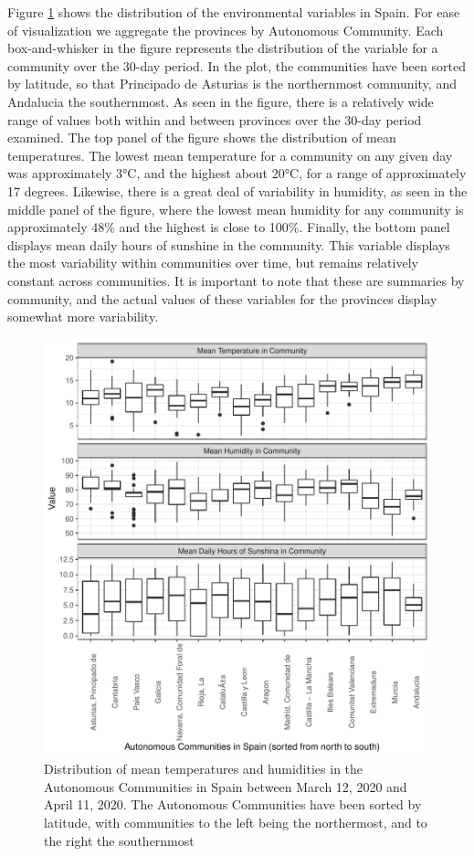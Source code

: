 \documentclass[]{elsarticle} %
\makeatletter
\def\maxwidth{\ifdim\Gin@nat@width>\linewidth\linewidth
\else\Gin@nat@width\fi}
\let\Oldincludegraphics\includegraphics
\renewcommand{\includegraphics}[1]{\Oldincludegraphics[width=\maxwidth]{#1}}
\makeatother
\begin{document}
Figure \ref{fig:descriptives-temperature} shows the distribution of the
environmental variables in Spain. For ease of visualization we aggregate
the provinces by Autonomous Community. Each box-and-whisker in the
figure represents the distribution of the variable for a community over
the 30-day period. In the plot, the communities have been sorted by
latitude, so that Principado de Asturias is the northernmost community,
and Andalucia the southernmost. As seen in the figure, there is a
relatively wide range of values both within and between provinces over
the 30-day period examined. The top panel of the figure shows the
distribution of mean temperatures. The lowest mean temperature for a
community on any given day was approximately 3°C, and the highest about
20°C, for a range of approximately 17 degrees. Likewise, there is a
great deal of variability in humidity, as seen in the middle panel of
the figure, where the lowest mean humidity for any community is
approximately 48\% and the highest is close to 100\%. Finally, the
bottom panel displays mean daily hours of sunshine in the community.
This variable displays the most variability within communities over
time, but remains relatively constant across communities. It is
important to note that these are summaries by community, and the actual
values of these variables for the provinces display somewhat more
variability.

\begin{figure}
\centering
\includegraphics{Environmental-Correlates-of-COVID19-Spain_files/figure-latex/descriptives-temperature-1.pdf}
\caption{\label{fig:descriptives-temperature} Distribution of mean
temperatures and humidities in the Autonomous Communities in Spain
between March 12, 2020 and April 11, 2020. The Autonomous Communities
have been sorted by latitude, with communities to the left being the
northermost, and to the right the southernmost}
\end{figure}
\end{document}
